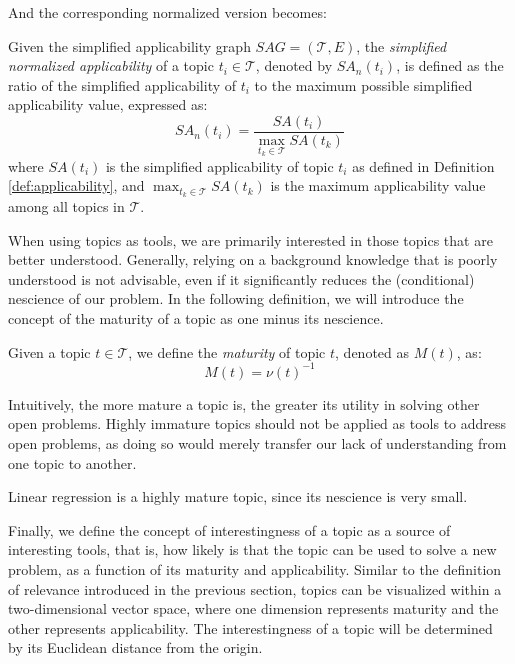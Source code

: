 And the corresponding normalized version becomes:

\begin{definition}
\label{def:normalized-simplified-applicability}
Given the simplified applicability graph $SAG = (\mathcal{T}, E)$, the \emph{simplified normalized applicability} of a topic $t_i \in \mathcal{T}$, denoted by $SA_n(t_i)$, is defined as the ratio of the simplified applicability of $t_i$ to the maximum possible simplified applicability value, expressed as:
\[
SA_n(t_i) = \frac{SA(t_i)}{\max_{t_k \in \mathcal{T}} SA(t_k)}
\]
where $SA(t_i)$ is the simplified applicability of topic $t_i$ as defined in Definition \ref{def:applicability}, and $\max_{t_k \in \mathcal{T}} SA(t_k)$ is the maximum applicability value among all topics in $\mathcal{T}$.
\end{definition}

When using topics as tools, we are primarily interested in those topics that are better understood. Generally, relying on a background knowledge that is poorly understood is not advisable, even if it significantly reduces the (conditional) nescience of our problem. In the following definition, we will introduce the concept of the maturity of a topic as one minus its nescience.

\begin{definition}
Given a topic $t \in \mathcal{T}$, we define the \emph{maturity} of topic $t$, denoted as $M(t)$, as:
\[
M(t) = \nu(t)^{-1}
\]
\end{definition}

Intuitively, the more mature a topic is, the greater its utility in solving other open problems. Highly immature topics should not be applied as tools to address open problems, as doing so would merely transfer our lack of understanding from one topic to another.

\begin{example}
Linear regression is a highly mature topic, since its nescience is very small.
\end{example}

Finally, we define the concept of interestingness of a topic as a source of interesting tools, that is, how likely is that the topic can be used to solve a new problem, as a function of its maturity and applicability. Similar to the definition of relevance introduced in the previous section, topics can be visualized within a two-dimensional vector space, where one dimension represents maturity and the other represents applicability. The interestingness of a topic will be determined by its Euclidean distance from the origin.

